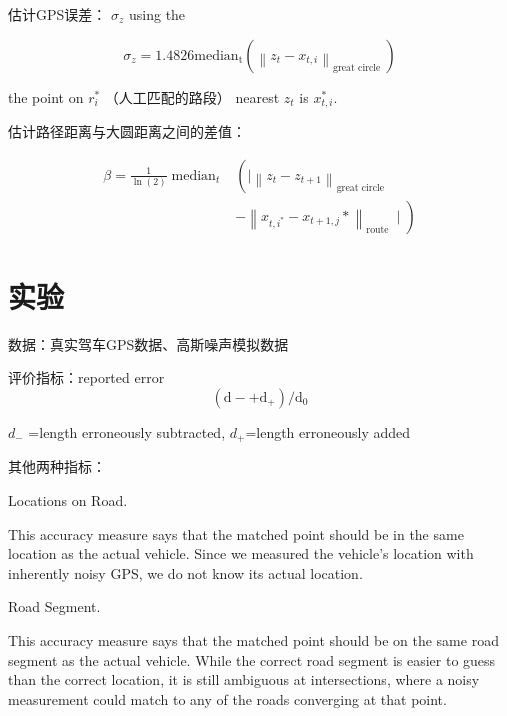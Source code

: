 估计GPS误差：
$ \sigma_{z} $ using the 

$$ \sigma_{z}=1.4826 \mathrm{median}_{\mathrm{t}}\left(\left\|z_{t}-x_{t, i}\right\|_{\text {great circle }}\right) $$

the point on $ r_{i}^{*} $ （人工匹配的路段） nearest $ z_{t} $ is $ x_{t, i}^{*} $.

估计路径距离与大圆距离之间的差值：

$$ \begin{aligned} \beta=\frac{1}{\ln (2)} \operatorname{median}_{t} &\left(\mid\left\|z_{t}-z_{t+1}\right\|_{\text {great circle }}\right.\\ &\left.-\left\|x_{t, i^{*}}-x_{t+1, j} *\right\|_{\text {route }} \mid\right) \end{aligned} $$



\section{实验}

数据：真实驾车GPS数据、高斯噪声模拟数据

评价指标：reported error
  $$ \left(\mathrm{d}-+\mathrm{d}_{+}\right) / \mathrm{d}_{0} $$ 

  $d_{-}  $ =length erroneously subtracted,
  $ d_{+} $=length erroneously added

 

其他两种指标：

  Locations on Road. 
  \begin{remark}
      This accuracy measure
  says that the matched point should be in the
  same location as the actual vehicle. Since we
  measured the vehicle’s location with inherently
  noisy GPS, we do not know its actual location.
  \end{remark}

  Road Segment.
  \begin{remark}
      This accuracy measure says
  that the matched point should be on the same
  road segment as the actual vehicle. While the
  correct road segment is easier to guess than the
  correct location, it is still ambiguous at
  intersections, where a noisy measurement could
  match to any of the roads converging at that
  point.
  \end{remark}
  
   